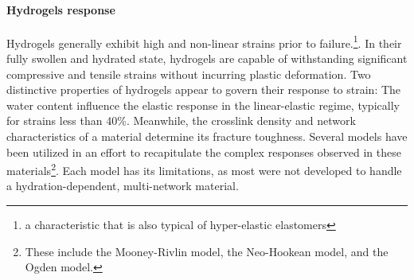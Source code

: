 \paragraph{Hydrogels response} Hydrogels generally exhibit high and non-linear strains prior to failure.\footnote{a characteristic that is also typical of hyper-elastic elastomers}.
In their fully swollen and hydrated state, hydrogels are capable of withstanding significant compressive and tensile strains without incurring plastic deformation. 
Two distinctive properties of hydrogels appear to govern their response to strain: 
    The water content influence the elastic response in the linear-elastic regime, typically for strains less than 40\%. 
    Meanwhile, the crosslink density and network characteristics of a material determine its fracture toughness.%
Several models have been utilized in an effort to recapitulate the complex responses observed in these materials\footnote{These include the Mooney-Rivlin model, the Neo-Hookean model, and the Ogden model.%
}. 
Each model has its limitations, as most were not developed to handle a hydration-dependent, multi-network material. 
